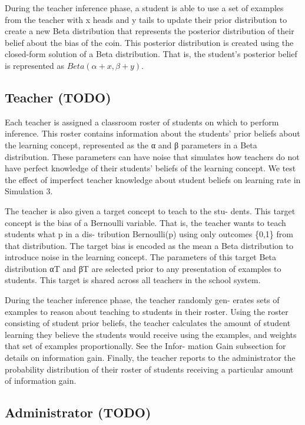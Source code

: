 \documentclass[10pt, letterpaper]{article}
\begin{document}
During the teacher inference phase, a student is able to use a set of
examples from the teacher with x heads and y tails to update their prior
distribution to create a new Beta distribution that represents the
posterior distribution of their belief about the bias of the coin. This
posterior distribution is created using the closed-form solution of a
Beta distribution. That is, the student's posterior belief is
represented as \(Beta(\alpha + x, \beta + y)\).

\subsection{Teacher (TODO)}\label{teacher-todo}

Each teacher is assigned a classroom roster of students on which to
perform inference. This roster contains information about the students'
prior beliefs about the learning concept, represented as the α and β
parameters in a Beta distribution. These parameters can have noise that
simulates how teachers do not have perfect knowledge of their students'
beliefs of the learning concept. We test the effect of imperfect teacher
knowledge about student beliefs on learning rate in Simulation 3.

The teacher is also given a target concept to teach to the stu- dents.
This target concept is the bias of a Bernoulli variable. That is, the
teacher wants to teach students what p in a dis- tribution Bernoulli(p)
using only outcomes \{0,1\} from that distribution. The target bias is
encoded as the mean a Beta distribution to introduce noise in the
learning concept. The parameters of this target Beta distribution αT and
βT are selected prior to any presentation of examples to students. This
target is shared across all teachers in the school system.

During the teacher inference phase, the teacher randomly gen- erates
sets of examples to reason about teaching to students in their roster.
Using the roster consisting of student prior beliefs, the teacher
calculates the amount of student learning they believe the students
would receive using the examples, and weights that set of examples
proportionally. See the Infor- mation Gain subsection for details on
information gain. Finally, the teacher reports to the administrator the
probability distribution of their roster of students receiving a
particular amount of information gain.

\subsection{Administrator (TODO)}\label{administrator-todo}
\end{document}
